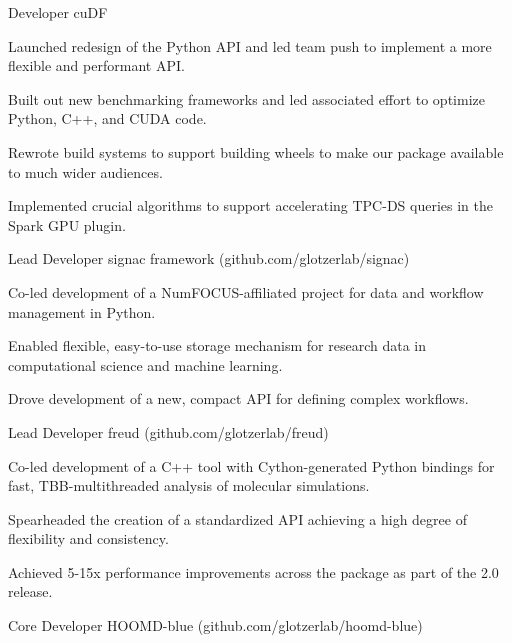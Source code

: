 \begin{cventries}
  \cventry
    {Developer} %
    {cuDF} %
    {} %
    {} %
{
      \begin{cvitems} %
        \item Launched redesign of the Python API and led team push to implement a more flexible and performant API.
        \item Built out new benchmarking frameworks and led associated effort to optimize Python, C++, and CUDA code.
        \item Rewrote build systems to support building wheels to make our package available to much wider audiences.
        \item Implemented crucial algorithms to support accelerating TPC-DS queries in the Spark GPU plugin.
      \end{cvitems}
    }
  \cventry
    {Lead Developer} %
    {signac framework ({\tiny github.com/glotzerlab/signac})} %
    {} %
    {} %
{
      \begin{cvitems} %
        \item Co-led development of a NumFOCUS-affiliated project for data and workflow management in Python.
        \item Enabled flexible, easy-to-use storage mechanism for research data in computational science and machine learning.
        \item Drove development of a new, compact API for defining complex workflows.
      \end{cvitems}
    }
  \cventry
    {Lead Developer} %
    {freud ({\tiny github.com/glotzerlab/freud})} %
    {} %
    {} %
{
      \begin{cvitems} %
        \item Co-led development of a C++ tool with Cython-generated Python bindings for fast, TBB-multithreaded analysis of molecular simulations.
        \item Spearheaded the creation of a standardized API achieving a high degree of flexibility and consistency.
        \item Achieved 5-15x performance improvements across the package as part of the 2.0 release.
      \end{cvitems}
    }
  \cventry
    {Core Developer} %
    {HOOMD-blue ({\tiny github.com/glotzerlab/hoomd-blue})} %
    {} %
    {} %
{
      \begin{cvitems} %

\end{cvitems}}
\end{cventries}
